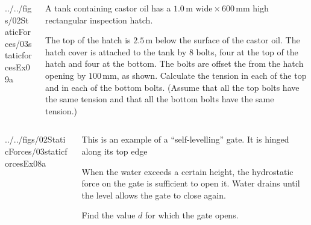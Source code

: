 \documentclass[9pt,xcolor={svgnames, x11names},professionalfonts, mathserif]{beamer}
\begin{document}
\begin{frame}
	\begin{columns}
		\begin{column}{0.45\textwidth}
			
			\begin{mybox}[colframe=example]
				\begin{cfig}[0.55]{../../figs/02StaticForces/03staticforcesEx09a}\end{cfig}
			\end{mybox}
		\end{column}
		\begin{column}{0.575\textwidth}
			\begin{myexam}[colbacktitle=example!80!white, colframe=example]{}{}
				\raggedright
				A tank containing castor oil has a $1.0\,\text{m wide}\times 600 \,\text{mm}$ high rectangular inspection hatch.\par\bigskip
				The top of the hatch is $2.5\,\text{m}$ below the surface of the castor oil. The hatch cover is attached to
				the tank by $8$ bolts, four at the top of the hatch and four at the bottom.\parm
				The bolts are offset the from the hatch opening by 	$100\,\text{mm}$, as shown.\parm
				Calculate the tension in each of the top and in each of the bottom bolts.\parm
				(Assume that all the top bolts have the same tension and that all the bottom bolts have the same tension.)
			\end{myexam}
		\end{column}
	\end{columns}
	
\end{frame}


\begin{frame}
	\begin{columns}
		\begin{column}{0.6\textwidth}
			\begin{mybox}
				\begin{cfig}[0.6]{../../figs/02StaticForces/03staticforcesEx08a}\end{cfig}
			\end{mybox}
			
		\end{column}
		\begin{column}{0.4\textwidth}
			\begin{myexam}{}{}
				\raggedright
				This is an example of a ``self-levelling'' gate. It is hinged along its top edge \par\bigskip
				When the water exceeds a certain height, the hydrostatic force on the gate is sufficient to
				open it. Water drains until the level allows the gate to close again. \par\bigskip
				Find the value $d$ for which the gate opens.
			\end{myexam}
		\end{column}
	\end{columns}
	
\end{frame}
\end{document}
